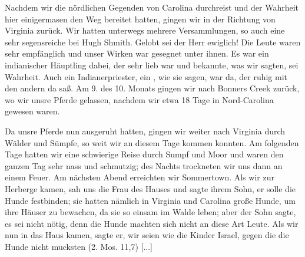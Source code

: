 Nachdem wir die nördlichen Gegenden von Carolina durchreist
und der Wahrheit hier einigermasen den Weg bereitet hatten,
gingen wir in der Richtung von Virginia zurück. Wir hatten
unterwegs mehrere Versammlungen, so auch eine sehr segensreiche
bei Hugh Shmith. Gelobt sei der Herr ewiglich! Die Leute waren
sehr empfänglich und unser Wirken war gesegnet unter ihnen. Es
war ein indianischer Häuptling dabei, der sehr lieb war und
bekannte, was wir sagten, sei Wahrheit. Auch ein Indianerpriester, 
ein , wie sie sagen, war da, der ruhig mit den
andern da saß. Am 9. des 10. Monats gingen wir nach Bonners
Creek zurück, wo wir unsre Pferde gelassen, nachdem wir etwa
18 Tage in Nord-Carolina gewesen waren.

Da unsre Pferde nun ausgeruht hatten, gingen wir weiter
nach Virginia durch Wälder und Sümpfe, so weit wir an diesem
Tage kommen konnten. Am folgenden Tage hatten wir eine
schwierige Reise durch Sumpf und Moor und waren den ganzen
Tag sehr nass und schmutzig; des Nachts trockneten wir uns dann
an einem Feuer. Am nächsten Abend erreichten wir Sommertown.
Als wir zur Herberge kamen, sah uns die Frau des Hauses und sagte
ihrem Sohn, er solle die Hunde festbinden; sie hatten nämlich
in Virginia und Carolina große Hunde, um ihre Häuser zu 
bewachen, da sie so einsam im Walde leben; aber der Sohn sagte,
es sei nicht nötig, denn die Hunde machten sich nicht an diese
Art Leute. Als wir nun in das Haus kamen, sagte er, wir
seien wie die Kinder Israel, gegen die die Hunde nicht mucksten
(2. Mos. 11,7) [...]

